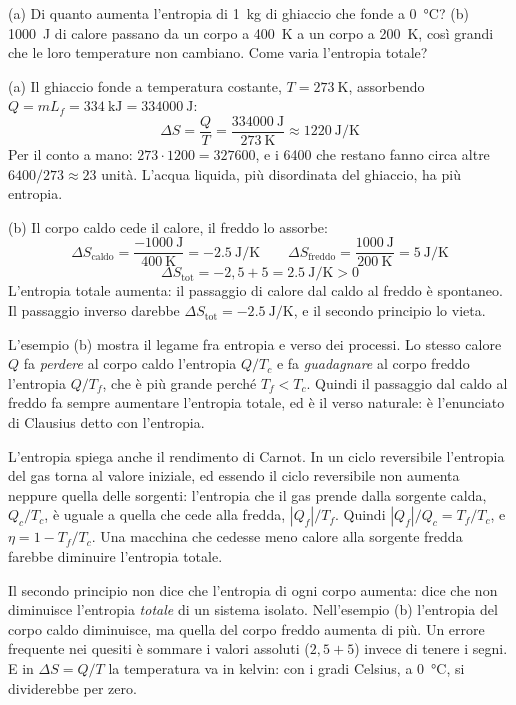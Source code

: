 \begin{esempio}
(a) Di quanto aumenta l'entropia di \SI{1}{\kilo\gram} di ghiaccio che fonde a \SI{0}{\celsius}? (b) \SI{1000}{\joule} di calore passano da un corpo a \SI{400}{\kelvin} a un corpo a \SI{200}{\kelvin}, così grandi che le loro temperature non cambiano. Come varia l'entropia totale?

(a) Il ghiaccio fonde a temperatura costante, $T = \SI{273}{\kelvin}$, assorbendo $Q = m L_f = \SI{334}{\kilo\joule} = \SI{334000}{\joule}$:
\[
  \Delta S = \frac{Q}{T} = \frac{\SI{334000}{\joule}}{\SI{273}{\kelvin}} \approx \SI{1220}{\joule\per\kelvin}
\]
Per il conto a mano: $273 \cdot 1200 = \num{327600}$, e i \num{6400} che restano fanno circa altre $6400/273 \approx 23$ unità. L'acqua liquida, più disordinata del ghiaccio, ha più entropia.

(b) Il corpo caldo cede il calore, il freddo lo assorbe:
\[
  \Delta S_{\text{caldo}} = \frac{\SI{-1000}{\joule}}{\SI{400}{\kelvin}} = \SI{-2,5}{\joule\per\kelvin}
  \qquad
  \Delta S_{\text{freddo}} = \frac{\SI{1000}{\joule}}{\SI{200}{\kelvin}} = \SI{5}{\joule\per\kelvin}
\]
\[
  \Delta S_{\text{tot}} = -2{,}5 + 5 = \SI{2,5}{\joule\per\kelvin} > 0
\]
L'entropia totale aumenta: il passaggio di calore dal caldo al freddo è spontaneo. Il passaggio inverso darebbe $\Delta S_{\text{tot}} = \SI{-2,5}{\joule\per\kelvin}$, e il secondo principio lo vieta.
\end{esempio}

L'esempio (b) mostra il legame fra entropia e verso dei processi. Lo stesso calore $Q$ fa \emph{perdere} al corpo caldo l'entropia $Q/T_c$ e fa \emph{guadagnare} al corpo freddo l'entropia $Q/T_f$, che è più grande perché $T_f < T_c$. Quindi il passaggio dal caldo al freddo fa sempre aumentare l'entropia totale, ed è il verso naturale: è l'enunciato di Clausius detto con l'entropia.

L'entropia spiega anche il rendimento di Carnot. In un ciclo reversibile l'entropia del gas torna al valore iniziale, ed essendo il ciclo reversibile non aumenta neppure quella delle sorgenti: l'entropia che il gas prende dalla sorgente calda, $Q_c/T_c$, è uguale a quella che cede alla fredda, $|Q_f|/T_f$. Quindi $|Q_f|/Q_c = T_f/T_c$, e $\eta = 1 - T_f/T_c$. Una macchina che cedesse meno calore alla sorgente fredda farebbe diminuire l'entropia totale.

\begin{attenzione}
Il secondo principio non dice che l'entropia di ogni corpo aumenta: dice che non diminuisce l'entropia \emph{totale} di un sistema isolato. Nell'esempio (b) l'entropia del corpo caldo diminuisce, ma quella del corpo freddo aumenta di più. Un errore frequente nei quesiti è sommare i valori assoluti ($2{,}5 + 5$) invece di tenere i segni. E in $\Delta S = Q/T$ la temperatura va in kelvin: con i gradi Celsius, a \SI{0}{\celsius}, si dividerebbe per zero.
\end{attenzione}


